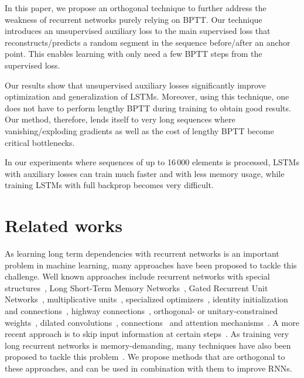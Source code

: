 \documentclass{article}
\begin{document}
In this paper, we propose an orthogonal technique to further address the weakness of recurrent networks purely relying on BPTT. Our technique introduces an unsupervised auxiliary loss to the main supervised loss that reconstructs/predicts a random segment in the sequence before/after an anchor point. This enables learning with only need a few BPTT steps from the supervised loss.


Our results show that unsupervised auxiliary losses significantly improve optimization and generalization of LSTMs. Moreover, using this technique, one does not have to perform lengthy BPTT during training to obtain good results. Our method, therefore, lends itself to very long sequences where vanishing/exploding gradients as well as the cost of lengthy BPTT become critical bottlenecks. 

In our experiments where sequences of up to 16\,000 elements is processed, LSTMs with auxiliary losses can train much faster and with less memory usage, while training LSTMs with full backprop becomes very difficult.

\section{Related works}

As learning long term dependencies with recurrent networks is an important problem in machine learning, many approaches have been proposed to tackle this challenge. Well known approaches include recurrent networks with special structures~\cite{el1996hierarchical,sperduti1997supervised,frasconi1998general,socher11,chan2016listen}, Long Short-Term Memory Networks~\cite{hochreiter1997long,gers1999learning,graves2013generating}, Gated Recurrent Unit Networks~\cite{cho2014learning,chung2014empirical}, multiplicative units~\cite{wu2016multiplicative}, specialized optimizers~\cite{martens2011learning,kingma2014adam}, identity initialization and connections~\cite{mikolov2014learning,le2015simple,he2016deep}, highway connections~\cite{zilly2016recurrent}, orthogonal- or unitary-constrained weights~\cite{white2004short,henaff2016recurrent,arjovsky2016unitary}, dilated convolutions~\citep{salimans2017pixelcnn++}, connections~\cite{koutnik2014clockwork} and attention mechanisms~\citep{bahdanau2014neural,luong2015effective,vaswani2017attention}. A more recent approach is to skip input information at certain steps~\cite{yu2017learning,seo2017neural,campos2017skip}. As training very long recurrent networks is memory-demanding, many techniques have also been proposed to tackle this problem~\cite{chen2016training,gruslys2016memory,Jaderberg16synthGrad}. We propose methods that are orthogonal to these approaches, and can be used in combination with them to improve RNNs. 
\end{document}
